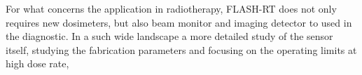 For what concerns the application in radiotherapy, FLASH-RT does not only requires new dosimeters, but also beam monitor and imaging detector to used in the diagnostic. In a such wide landscape a more detailed study of the sensor itself, studying the fabrication parameters and focusing on the operating limits at high dose rate, 



